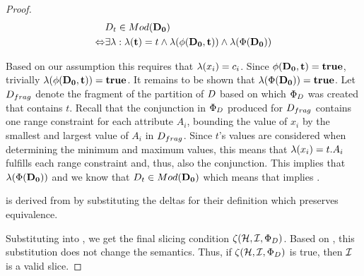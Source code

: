 \begin{proof}
\begin{align*}
  &D_t \in Mod({\mathbf{D_0}})\\
  \Leftrightarrow &\exists \lambda: \lambda(\mathbf{t}) = t \land \lambda(\phi(\mathbf{D_0},\mathbf{t})) \land \lambda(\Phi(\mathbf{D_0}))
\end{align*}

Based on our assumption this requires that $\lambda(x_i) = c_i$. Since $\phi(\mathbf{D_0},\mathbf{t}) = \mathbf{true}$, trivially $\lambda(\phi(\mathbf{D_0},\mathbf{t})) = \mathbf{true}$. It remains to be shown that $\lambda(\Phi(\mathbf{D_0})) = \mathbf{true}$. Let $D_{frag}$ denote the fragment of the partition of $D$ based on which $\Phi_{D}$ was created that contains $t$. Recall that the conjunction in $\Phi_{D}$ produced for $D_{frag}$ contains one range constraint for each attribute $A_i$, bounding the value of $x_i$ by the smallest and largest value of $A_i$ in $D_{frag}$. Since $t$'s values are considered when determining the minimum and maximum values, this means that $\lambda(x_i) = t.A_i$ fulfills each range constraint and, thus, also the conjunction. This implies that $\lambda(\Phi(\mathbf{D_0}))$ and we know that $D_t \in Mod({\mathbf{D_0}})$ which means that  implies .

 is derived from  by substituting the deltas for their definition which preserves equivalence.



Substituting  into , we get the final slicing condition $\zeta({\mathcal{H}},{\mathcal{I}},{\Phi_{D}})$. Based on , this substitution does not change the semantics. Thus, if $\zeta({\mathcal{H}},{\mathcal{I}},{\Phi_{D}})$ is true, then $\mathcal{I}$ is a valid slice.

%     

%     
%     
%     
%     
%     
%     
%     
%     

%     


  \end{proof}

